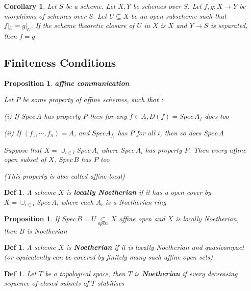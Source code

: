 \documentclass{article}
\newtheorem{definition}[theorem]{Def}
\newtheorem{corollary}[theorem]{Corollary}
\newtheorem{proposition}[theorem]{Proposition}
\begin{document}
\begin{corollary}
    Let $S$ be a scheme. Let $X, Y$ be schemes over $S$. Let $f,g:X \to Y$ be morphisms of schemes over $S$. Let $U \subseteq X$ be an open subscheme such that $f|_U=g|_U$. If the scheme theoretic closure of $U$ in $X$ is $X$ and $Y \to S$ is separated, then $f=g$
\end{corollary}



\newpage
\subsection{Finiteness Conditions}

\begin{proposition}
    \textbf{affine communication}

Let $P$ be some property of
affine schemes, such that :

(i) If $Spec\, A$ has property $P$ then for any $f \in A,
D(f)=Spec\, A_f$ does too

(ii) If $(f_1,\cdots, f_n) = A$, and $Spec A_{f_i}$ has $P$ for all $i$, then so does $Spec\, A$

Suppose that $X = \cup_{i\in I} Spec\, A_i$ where $Spec\, A_i$ has property $P$. Then every affine open
subset of $X$, $Spec\, B$ has $P$ too

(This property is also called affine-local)
\end{proposition}

\begin{definition}
    A scheme $X$ is \textbf{locally Noetherian} if it has a open cover by $X=\cup_{i\in I} Spec\, A_i$ where each $A_i$ is a Noetherian ring
\end{definition}

\begin{proposition}
    If $Spec\, B=U\mathop{\subset}\limits_{open}
    \,X$ affine open and $X$ is locally Noetherian, then $B$ is Noetherian
\end{proposition}

\begin{definition}
    A scheme $X$ is \textbf{Noetherian} if it is locally Noetherian and quasicompact (or equivalently can be covered by finitely many such affine open sets)
\end{definition}

\begin{definition}
    Let $T$ be a topological space, then $T$ is \textbf{Noetherian} if every decreasing sequence of closed subsets of $T$ stabilises
\end{definition}
\end{document}
